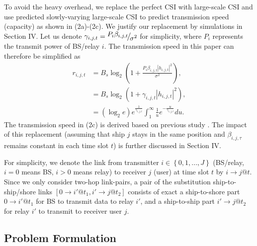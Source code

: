 \documentclass[journal]{IEEEtran}
\begin{document}
 To avoid the heavy overhead, we replace the perfect CSI with large-scale CSI and use predicted slowly-varying large-scale CSI to predict transmission speed (capacity) as shown in (2a)-(2c). We justify our replacement by simulations in Section IV. Let us denote ${\gamma _{i,j,t }} = {\raise0.7ex\hbox{${{P_{i} }{\beta _{i,j,t }}}$} \!\mathord{\left/
  {\vphantom {{{P_{i} }{\beta _{i,j,t }}} {{\sigma ^2}}}}\right.\kern-\nulldelimiterspace}
 \!\lower0.7ex\hbox{${{\sigma ^2}}$}}$ for simplicity, where ${P_{i}}$ represents the transmit power of BS/relay $i$. The transmission speed in this paper can therefore be simplified as
 \begin{subequations}
 \begin{align}
 {r_{i,j,t}} & = {{B_s}{{\log }_2}\left( {1 + \frac{{{P_{i} }{\beta _{i,j,t }}{{\left| {{h_{i,j,t }}} \right|}^2}}}{{{\sigma ^2}}}} \right)},\\
 & = {B_s}{\log }_2 \left( {1 + {\gamma _{i,j,t }}{{\left| {{h_{i,j,t }}} \right|}^2}} \right),\\
 & = \left( {{{\log }_2}e} \right){e^{\frac{1}{{{\gamma _{i,j,t }}}}}}\int_1^\infty {\frac{1}{u}{e^{ - \frac{u}{{{\gamma _{i,j,t }}}}}}du} .
 \end{align}
 \end{subequations}
 The transmission speed in (2c) is derived based on previous study \cite{p41}. The impact of this replacement (assuming that ship $j$ stays in the same position and $\beta _{i,j,\tau }$ remains constant in each time slot $t$) is further discussed in Section IV. 

 For simplicity, we denote the link from transmitter $i \in \left\{ {0,1,...,J} \right\}$ (BS/relay, $i = 0$ means BS, $i > 0$ means relay) to receiver $j$ (user) at time slot $t$ by $i \to j@t$. Since we only consider two-hop link-pairs, a pair of the substitution ship-to-ship/shore links $\left[ {0 \to i'@{t_1},i' \to j@{t_2}} \right]$ consists of exact a ship-to-shore part $0 \to i'@{t_1}$ for BS to transmit data to relay ${i'}$, and a ship-to-ship part $i' \to j@{t_2}$ for relay ${i'}$ to transmit to receiver user $j$. 
 
 
 \subsection{Problem Formulation}
 
\end{document}
